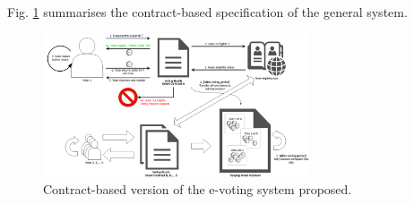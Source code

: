 \documentclass[./4_GeneralApproach.tex]{subfiles}
\begin{document}
Fig. \ref{fig:contract_based_architecture} summarises the contract-based specification of the general system.

\begin{figure}[htp]
    \centering
    \includegraphics[width=0.7\textwidth]{../Images/02_contract_based_solution.png}
    \caption{Contract-based version of the e-voting system proposed.}
    \label{fig:contract_based_architecture}
\end{figure}
\end{document}
